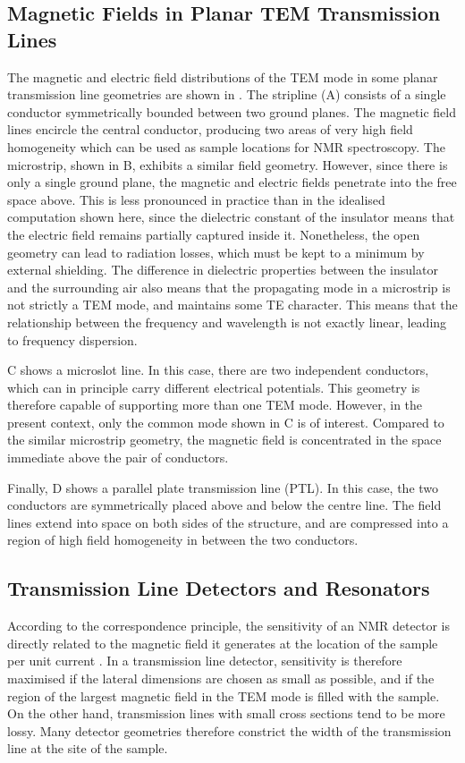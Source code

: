 \subsection{Magnetic Fields in Planar TEM Transmission Lines}

The magnetic and electric field distributions of the TEM mode in some
planar transmission line geometries are shown in . 
The stripline (A) consists of a single conductor
 symmetrically bounded between two ground planes. The
magnetic field lines encircle the central conductor, producing two areas
of very high field homogeneity which can be used as sample locations for
NMR spectroscopy. The microstrip, shown in B,
 exhibits a similar field geometry. However, since there is only 
 a single ground plane, the magnetic and electric fields penetrate into 
 the free space above. This
is less pronounced in practice than in the idealised computation shown
here, since the dielectric constant of the insulator means that the
electric field remains partially captured inside it. Nonetheless, the
open geometry can lead to radiation losses, which must be kept to a
minimum by external shielding. The difference in dielectric properties between
the insulator and the surrounding air also means that the propagating
mode in a microstrip is not strictly a TEM mode, and maintains some TE character.
This means that the relationship between the frequency and wavelength 
is not exactly linear, leading to frequency dispersion.

C shows a microslot line. In this
case, there are two independent conductors, which can in principle carry
different electrical potentials. This geometry is therefore capable of
supporting more than one TEM mode. However, in the present context, only
the common mode shown in C is of interest. Compared to the
similar microstrip geometry, the magnetic field is concentrated in the
space immediate above the pair of conductors.

Finally, D shows a parallel plate transmission line (PTL). 
In this case, the two conductors are symmetrically placed above and below the centre line. 
The field lines extend into space on both sides of the structure, and are
compressed into a region of high field homogeneity in between the two 
conductors. 


\subsection{Transmission Line Detectors and Resonators}\label{transmission-line-resonators}
According to the correspondence principle, the sensitivity of an NMR detector
is directly related to the magnetic field it generates at the location of
the sample per unit current \cite{Hoult:1976dw}. In a transmission line
detector, sensitivity is therefore maximised if the lateral dimensions are chosen
as small as possible, and if the region of the largest magnetic field in the TEM
mode is filled with the sample. On the other hand, transmission lines with small 
cross sections tend to be more lossy. Many detector geometries therefore constrict the
width of the transmission line at the site of the sample.

